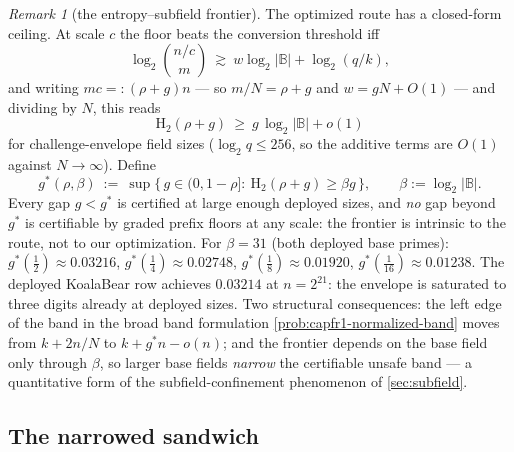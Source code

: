\documentclass[11pt]{article}
\theoremstyle{definition}
\theoremstyle{remark}
\newtheorem{remark}[remark]{Remark}
\newcommand{\B}{\mathbb{B}}
\newcommand{\Hb}{\mathrm{H}_2}
\begin{document}
\begin{remark}[the entropy--subfield frontier]\label{rem:entropy-frontier}
The optimized route has a closed-form ceiling. At scale $c$ the floor beats the conversion threshold iff
\[
\log_2\binom{n/c}{m}\ \gtrsim\ w\log_2|\B|+\log_2(q/k),
\]
and writing $mc=:(\rho+g)n$ --- so $m/N=\rho+g$ and $w=gN+O(1)$ --- and dividing by $N$, this reads
\[
\Hb(\rho+g)\ \ge\ g\,\log_2|\B|+o(1)
\]
for challenge-envelope field sizes ($\log_2q\le256$, so the additive terms are $O(1)$ against $N\to\infty$). Define
\[
g^*(\rho,\beta)\ :=\ \sup\bigl\{\,g\in(0,1-\rho]:\ \Hb(\rho+g)\ge\beta g\,\bigr\},
\qquad
\beta:=\log_2|\B| .
\]
Every gap $g<g^*$ is certified at large enough deployed sizes, and \emph{no} gap beyond $g^*$ is certifiable by graded prefix floors at any scale: the frontier is intrinsic to the route, not to our optimization. For $\beta=31$ (both deployed base primes): $g^*(\tfrac12)\approx0.03216$, $g^*(\tfrac14)\approx0.02748$, $g^*(\tfrac18)\approx0.01920$, $g^*(\tfrac1{16})\approx0.01238$. The deployed KoalaBear row achieves $0.03214$ at $n=2^{21}$: the envelope is saturated to three digits already at deployed sizes. Two structural consequences: the left edge of the band in the broad band formulation \cref{prob:capfr1-normalized-band} moves from $k+2n/N$ to $k+g^*n-o(n)$; and the frontier depends on the base field only through $\beta$, so larger base fields \emph{narrow} the certifiable unsafe band --- a quantitative form of the subfield-confinement phenomenon of \cref{sec:subfield}.
\end{remark}

\subsection{The narrowed sandwich}\label{sec:pincer-sandwich}
\end{document}
